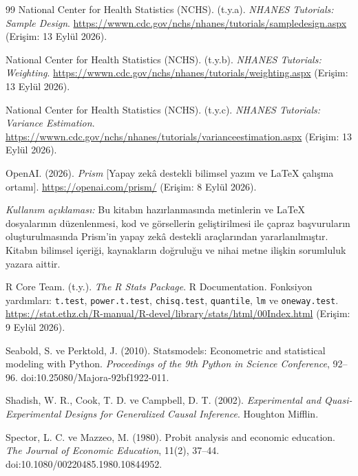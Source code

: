 \begin{thebibliography}{99}
National Center for Health Statistics (NCHS). (t.y.a).
\textit{NHANES Tutorials: Sample Design}.
\url{https://wwwn.cdc.gov/nchs/nhanes/tutorials/sampledesign.aspx}
(Erişim: 13 Eylül 2026).

National Center for Health Statistics (NCHS). (t.y.b).
\textit{NHANES Tutorials: Weighting}.
\url{https://wwwn.cdc.gov/nchs/nhanes/tutorials/weighting.aspx}
(Erişim: 13 Eylül 2026).

National Center for Health Statistics (NCHS). (t.y.c).
\textit{NHANES Tutorials: Variance Estimation}.
\url{https://wwwn.cdc.gov/nchs/nhanes/tutorials/varianceestimation.aspx}
(Erişim: 13 Eylül 2026).

OpenAI. (2026).
\textit{Prism} [Yapay zekâ destekli bilimsel yazım ve LaTeX çalışma ortamı].
\url{https://openai.com/prism/} (Erişim: 8 Eylül 2026).

\emph{Kullanım açıklaması:} Bu kitabın hazırlanmasında metinlerin ve LaTeX
dosyalarının düzenlenmesi, kod ve görsellerin geliştirilmesi ile çapraz
başvuruların oluşturulmasında Prism'in yapay zekâ destekli araçlarından
yararlanılmıştır. Kitabın bilimsel içeriği, kaynakların doğruluğu ve nihai
metne ilişkin sorumluluk yazara aittir.

R Core Team. (t.y.). \textit{The R Stats Package}. R Documentation.
Fonksiyon yardımları: \texttt{t.test}, \texttt{power.t.test},
\texttt{chisq.test}, \texttt{quantile}, \texttt{lm} ve \texttt{oneway.test}.
\url{https://stat.ethz.ch/R-manual/R-devel/library/stats/html/00Index.html}
(Erişim: 9 Eylül 2026).

Seabold, S. ve Perktold, J. (2010). Statsmodels: Econometric and statistical
modeling with Python. \textit{Proceedings of the 9th Python in Science
Conference}, 92--96. doi:10.25080/Majora-92bf1922-011.

Shadish, W. R., Cook, T. D. ve Campbell, D. T. (2002).
\textit{Experimental and Quasi-Experimental Designs for Generalized Causal
Inference}. Houghton Mifflin.

Spector, L. C. ve Mazzeo, M. (1980). Probit analysis and economic education.
\textit{The Journal of Economic Education}, 11(2), 37--44.
doi:10.1080/00220485.1980.10844952.


\end{thebibliography}
